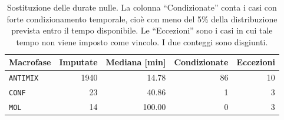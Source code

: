 \begin{table}[htbp]
\centering
\small
\begin{tabularx}{\linewidth}{@{}Xrrrr@{}}
\toprule
\textbf{Macrofase} & \textbf{Imputate} & \textbf{Mediana [min]} & \textbf{Condizionate} & \textbf{Eccezioni}\\
\midrule
\texttt{ANTIMIX} & \num{1940} & \num{14.78} & 86 & 10 \\
\texttt{CONF} & 23 & \num{40.86} & 1 & 3 \\
\texttt{MOL} & 14 & \num{100.00} & 0 & 3 \\
\bottomrule
\end{tabularx}
\caption{Sostituzione delle durate nulle. La colonna ``Condizionate'' conta i casi con forte condizionamento temporale, cioè con meno del 5\% della distribuzione prevista entro il tempo disponibile. Le ``Eccezioni'' sono i casi in cui tale tempo non viene imposto come vincolo. I due conteggi sono disgiunti.}
\label{tab:zero-duration-results}
\end{table}
